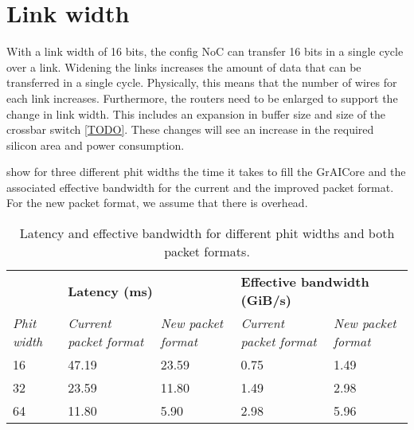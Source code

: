 \section{Link width}
With a link width of 16 bits, the config NoC can transfer 16 bits in a single cycle over a link.
Widening the links increases the amount of data that can be transferred in a single cycle.
Physically, this means that the number of wires for each link increases.
Furthermore, the routers need to be enlarged to support the change in link width.
This includes an expansion in buffer size and size of the crossbar switch \cref{TODO}.
These changes will see an increase in the required silicon area and power consumption.

 show for three different phit widths the time it takes to fill the GrAICore and the associated effective bandwidth for the current and the improved packet format.
For the new packet format, we assume that there is overhead.

\begin{table}[hbtp]
\centering
\begin{adjustbox}{width=\linewidth}
\begin{tabular}{@{}lllll@{}}
\toprule
                    & \multicolumn{2}{l}{\textbf{Latency (ms)}} & \multicolumn{2}{l}{\textbf{Effective bandwidth (GiB/s)}} \\ \cmidrule(lr){2-3} \cmidrule(lr){4-5}
\textit{Phit width} & \textit{Current packet format}    & \textit{New packet format}   & \textit{Current packet format}    & \textit{New packet format}   \\ \midrule
16                  & 47.19                    & 23.59               & 0.75                     & 1.49                \\
32                  & 23.59                    & 11.80               & 1.49                     & 2.98                \\
64                  & 11.80                    & 5.90                & 2.98                     & 5.96                \\ \bottomrule
\end{tabular}
\end{adjustbox}
\caption{Latency and effective bandwidth for different phit widths and both packet formats.}
\label{tab:latency_bandwidth_phit_width_packet_format}
\end{table}

